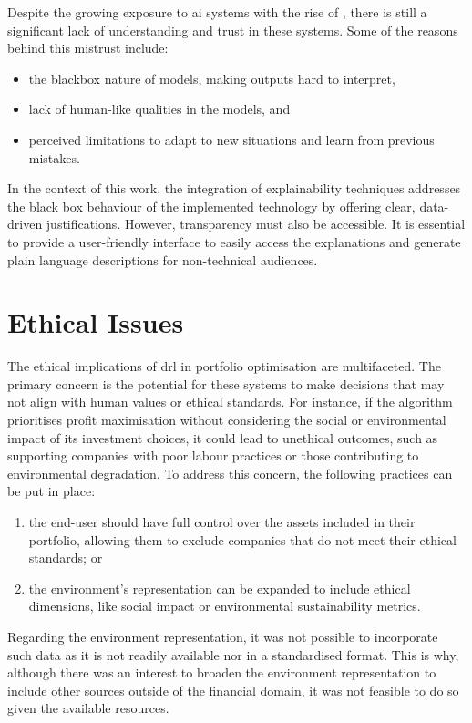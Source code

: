 Despite the growing exposure to \acrfull{ai} systems with the rise of , there is still a significant lack of understanding and trust in these systems. Some of the reasons behind this mistrust include:
\begin{itemize}
    \item the \gls{blackbox} nature of models, making outputs hard to interpret,
    \item lack of human-like qualities in the models, and
    \item perceived limitations to adapt to new situations and learn from previous mistakes.
\end{itemize}

In the context of this work, the integration of explainability techniques addresses the black box behaviour of the implemented technology by offering clear, data-driven justifications. However, transparency must also be accessible. It is essential to provide a user-friendly interface to easily access the explanations and generate plain language descriptions for non-technical audiences.

\section{Ethical Issues} \label{sec:ethical-issues}

The ethical implications of \acrshort{drl} in portfolio optimisation are multifaceted. The primary concern is the potential for these systems to make decisions that may not align with human values or ethical standards. For instance, if the algorithm prioritises profit maximisation without considering the social or environmental impact of its investment choices, it could lead to unethical outcomes, such as supporting companies with poor labour practices or those contributing to environmental degradation. To address this concern, the following practices can be put in place:
\begin{enumerate}
    \item the end-user should have full control over the assets included in their portfolio, allowing them to exclude companies that do not meet their ethical standards; or
    \item the environment's representation can be expanded to include ethical dimensions, like social impact or environmental sustainability metrics.
\end{enumerate}

Regarding the environment representation, it was not possible to incorporate such data as it is not readily available nor in a standardised format. This is why, although there was an interest to broaden the environment representation to include other sources outside of the financial domain, it was not feasible to do so given the available resources.

